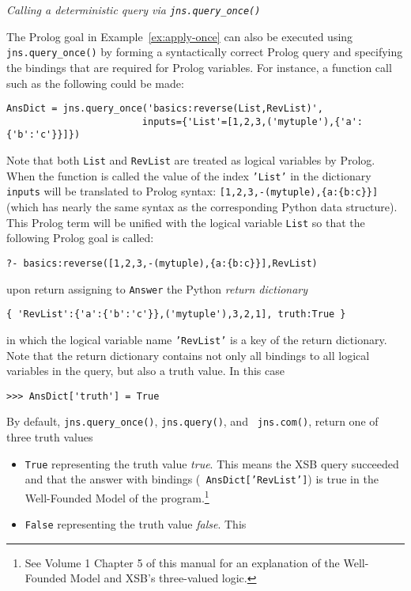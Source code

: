 \begin{example} \rm {\em Calling a deterministic query via {\tt jns.query\_once()}}
  \label{ex:query-once}
  
\noindent
The Prolog goal in Example~\ref{ex:apply-once} can also be executed
using {\tt jns.query\_once()} by forming a syntactically correct Prolog
query and specifying the bindings that are required for Prolog
variables.  For instance, a function call such as the following could
be made:

\begin{verbatim}
AnsDict = jns.query_once('basics:reverse(List,RevList)',
                        inputs={'List'=[1,2,3,('mytuple'),{'a':{'b':'c'}}]})
\end{verbatim}

\noindent
Note that both {\tt List} and {\tt RevList} are treated as logical
variables by Prolog.  When the function is called the value of the
index {\tt 'List'} in the dictionary {\tt inputs} will be translated
to Prolog syntax: \verb|[1,2,3,-(mytuple),{a:{b:c}}]| (which has
nearly the same syntax as the corresponding Python data structure).
This Prolog term will be unified with the logical variable {\tt List}
so that the following Prolog goal is called:
\begin{verbatim}
?- basics:reverse([1,2,3,-(mytuple),{a:{b:c}}],RevList)
\end{verbatim}
upon return assigning to {\tt Answer} the Python {\em return dictionary}
\begin{verbatim}
{ 'RevList':{'a':{'b':'c'}},('mytuple'),3,2,1], truth:True }
\end{verbatim}
in which the logical variable name {\tt 'RevList'} is a key of the
return dictionary.  Note that the return dictionary contains not only
all bindings to all logical variables in the query, but also a truth
value.  In this case
\begin{verbatim}
>>> AnsDict['truth'] = True
\end{verbatim}
By default, {\tt jns.query\_once()}, {\tt jns.query()}, and {\tt
  jns.com()}, return one of three truth values
\begin{itemize}
\item {\tt True} representing the truth value {\em true}.  This means
  the XSB query succeeded and that the answer with bindings ({\tt
    AnsDict['RevList']}) is true in the Well-Founded Model of the
  program.\footnote{See Volume 1 Chapter 5 of this manual for an
  explanation of the Well-Founded Model and XSB's three-valued logic.}
\item {\tt False} representing the truth value {\em false}.  This

\end{itemize}
\end{example}
